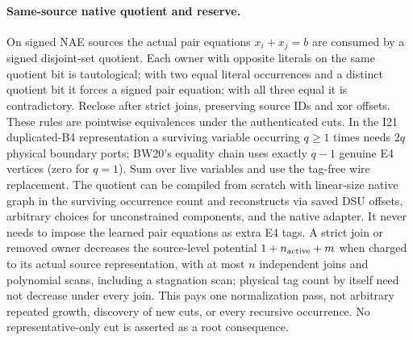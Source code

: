 \documentclass[11pt]{article}
\begin{document}
\paragraph{Same-source native quotient and reserve.} On signed NAE sources the actual pair equations $x_i+x_j=b$ are consumed by a signed disjoint-set quotient. Each owner with opposite literals on the same quotient bit is tautological; with two equal literal occurrences and a distinct quotient bit it forces a signed pair equation; with all three equal it is contradictory. Reclose after strict joins, preserving source IDs and xor offsets. These rules are pointwise equivalences under the authenticated cuts. In the I21 duplicated-B4 representation a surviving variable occurring $q\ge1$ times needs $2q$ physical boundary ports; BW20's equality chain uses exactly $q-1$ genuine E4 vertices (zero for $q=1$). Sum over live variables and use the tag-free wire replacement. The quotient can be compiled from scratch with linear-size native graph in the surviving occurrence count and reconstructs via saved DSU offsets, arbitrary choices for unconstrained components, and the native adapter. It never needs to impose the learned pair equations as extra E4 tags. A strict join or removed owner decreases the source-level potential $1+n_{\rm active}+m$ when charged to its actual source representation, with at most $n$ independent joins and polynomial scans, including a stagnation scan; physical tag count by itself need not decrease under every join. This pays one normalization pass, not arbitrary repeated growth, discovery of new cuts, or every recursive occurrence. No representative-only cut is asserted as a root consequence.
\end{document}
